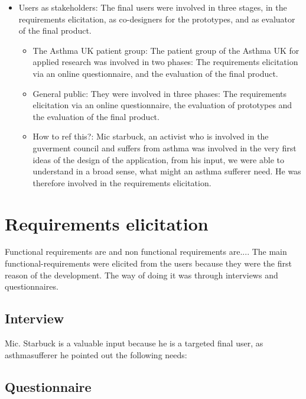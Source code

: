 \begin{itemize}
	\item Users as stakeholders: The final users were involved in three stages, in the requirements elicitation, as co-designers for the prototypes, and as evaluator of the final product. 
    \begin{itemize}

		    \item The Asthma UK patient group: The patient group of the Asthma UK for applied research was involved in two phases: The requirements elicitation via an online questionnaire, and the evaluation of the final product.
			\item General public: They were involved in three phases: The requirements elicitation via an online questionnaire, the evaluation of  prototypes and the evaluation of the final product. 
			\item How to ref this?: Mic starbuck, an activist who is involved in the guverment council and suffers from asthma was involved in the very first ideas of the design of the application, from his input, we were able to understand in a broad sense, what might an asthma sufferer need. He was therefore involved in the requirements elicitation.  


	\end{itemize}

\end{itemize}

\section{Requirements elicitation}
Functional requirements are and non functional requirements are.... 
The main functional-requirements were elicited from the users because they were the first reason of the development. The way of doing it was through interviews and questionnaires.



\subsection{Interview}



Mic. Starbuck is a valuable input because he is a targeted final user, as asthmasufferer he pointed out the following needs: 

\subsection{Questionnaire}

